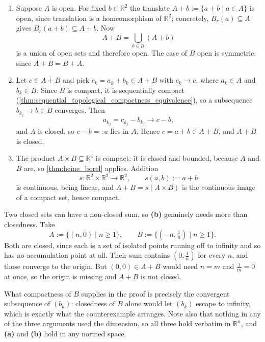 \begin{exercisesolution}
\label{sol:sumset_open_closed_compact}
\begin{enumerate}[label=\textbf{(\alph*)}]
  \item Suppose $A$ is open. For fixed $b \in \mathbb{R}^2$ the translate
    $A + b := \{a+b \mid a \in A\}$ is open, since translation is a homeomorphism of
    $\mathbb{R}^2$; concretely, $B_r(a) \subseteq A$ gives $B_r(a+b) \subseteq A+b$. Now
    \[A + B = \bigcup_{b \in B} (A+b)\]
    is a union of open sets and therefore open. The case of $B$ open is symmetric, since
    $A+B = B+A$.

  \item Let $c \in \overline{A+B}$ and pick $c_k = a_k + b_k \in A+B$ with $c_k \to c$, where
    $a_k \in A$ and $b_k \in B$. Since $B$ is compact, it is sequentially compact
    (\cref{thm:sequential_topological_compactness_equivalence}), so a subsequence
    $b_{k_j} \to b \in B$ converges. Then
    \[a_{k_j} = c_{k_j} - b_{k_j} \longrightarrow c - b,\]
    and $A$ is closed, so $c - b =: a$ lies in $A$. Hence $c = a + b \in A+B$, and $A+B$ is closed.

  \item The product $A \times B \subseteq \mathbb{R}^4$ is compact: it is closed and bounded,
    because $A$ and $B$ are, so \cref{thm:heine_borel} applies. Addition
    \[s : \mathbb{R}^2\times\mathbb{R}^2 \to \mathbb{R}^2, \qquad s(a,b) := a+b\]
    is continuous, being linear, and $A+B = s(A\times B)$ is the continuous image of a compact set,
    hence compact.
\end{enumerate}
\begin{remark}
Two closed sets can have a non-closed sum, so \textbf{(b)} genuinely needs more than closedness.
Take
\[A := \{(n,0) \mid n \geq 1\}, \qquad B := \{(-n,\tfrac1n) \mid n \geq 1\}.\]
Both are closed, since each is a set of isolated points running off to infinity and so has no
accumulation point at all. Their sum contains $(0,\tfrac1n)$ for every $n$, and those converge to
the origin. But $(0,0) \in A+B$ would need $n = m$ and $\tfrac1m = 0$ at once, so the origin is
missing and $A+B$ is not closed.

What compactness of $B$ supplies in the proof is precisely the convergent subsequence of
$(b_k)$: closedness of $B$ alone would let $(b_k)$ escape to infinity, which is exactly what the
counterexample arranges. Note also that nothing in any of the three arguments used the dimension,
so all three hold verbatim in $\mathbb{R}^n$, and \textbf{(a)} and \textbf{(b)} hold in any normed
space.
\end{remark}
\end{exercisesolution}

